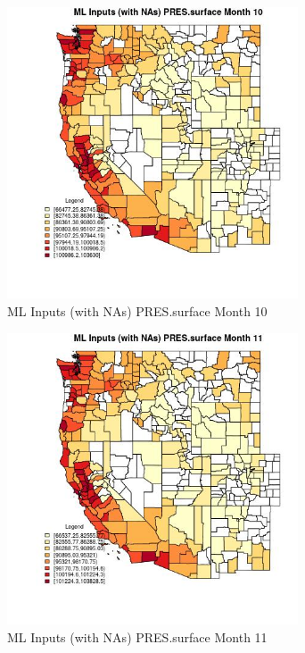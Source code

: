 \begin{figure} 
\centering  
\includegraphics[width=0.77\textwidth]{Code_Outputs/Report_ML_input_PM25_Step4_part_f_de_duplicated_aves_prioritize_24hr_obswNAs_CountyPRESsurfacemedianMonth10.jpg} 
\caption{\label{fig:Report_ML_input_PM25_Step4_part_f_de_duplicated_aves_prioritize_24hr_obswNAsCountyPRESsurfacemedianMonth10}ML Inputs (with NAs) PRES.surface Month 10} 
\end{figure} 
 

\begin{figure} 
\centering  
\includegraphics[width=0.77\textwidth]{Code_Outputs/Report_ML_input_PM25_Step4_part_f_de_duplicated_aves_prioritize_24hr_obswNAs_CountyPRESsurfacemedianMonth11.jpg} 
\caption{\label{fig:Report_ML_input_PM25_Step4_part_f_de_duplicated_aves_prioritize_24hr_obswNAsCountyPRESsurfacemedianMonth11}ML Inputs (with NAs) PRES.surface Month 11} 
\end{figure} 
 

